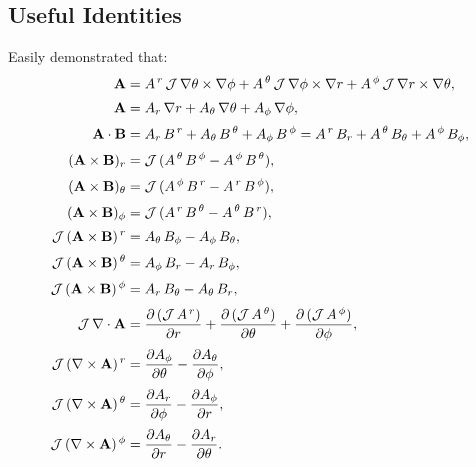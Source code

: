 \documentclass[notitlepage,12pt]{article}
\begin{document}
\subsection{Useful Identities}\label{s2}
Easily demonstrated that:
\begin{align}
{\bf A} &= A^{\,r}\,{\cal J}\,\nabla\theta\times\nabla\phi
+  A^{\,\theta}\,{\cal J}\,\nabla\phi\times\nabla r
+  A^{\,\phi}\,{\cal J}\,\nabla r\times\nabla\theta,\\[0.5ex]
{\bf A} &= A_r\,\nabla r+A_\theta\,\nabla\theta+A_\phi\,\nabla\phi,\\[0.5ex]
{\bf A}\cdot{\bf B} &= A_r\,B^{\,r}+A_\theta \,B^{\,\theta}+A_\phi\,B^{\,\phi}=A^{\,r}\,B_r+A^{\,\theta}\,B_{\theta}+A^{\,\phi}\,B_\phi,\\[0.5ex]
({\bf A}\times {\bf B})_r &= {\cal J}\,(A^{\,\theta}\,B^{\,\phi}-A^{\,\phi}\,B^{\,\theta}),\\[0.5ex]
({\bf A}\times {\bf B})_\theta &= {\cal J}\,(A^{\,\phi}\,B^{\,r}-A^{\,r}\,B^{\,\phi}),\\[0.5ex]
({\bf A}\times {\bf B})_\phi &= {\cal J}\,(A^{\,r}\,B^{\,\theta}-A^{\,\theta}\,B^{\,r}),\\[0.5ex]
{\cal J}\,({\bf A}\times {\bf B})^{\,r} &= A_{\theta}\,B_{\phi}-A_{\phi}\,B_{\theta},\\[0.5ex]
{\cal J}\,({\bf A}\times {\bf B})^{\,\theta} &= A_{\phi}\,B_{r}-A_{r}\,B_{\phi},\\[0.5ex]
{\cal J}\,({\bf A}\times {\bf B})^{\,\phi} &=A_{r}\,B_{\theta}-A_{\theta}\,B_{r},\\[0.5ex]
{\cal J}\,\nabla \cdot{\bf A} &= \frac{\partial\,({\cal J}\,A^{\,r})}{\partial r} + 
\frac{\partial\,({\cal J}\,A^{\,\theta})}{\partial \theta}+ 
\frac{\partial\,({\cal J}\,A^{\,\phi})}{\partial \phi},\\[0.5ex]
{\cal J}\,(\nabla\times {\bf A})^{\,r}&= \frac{\partial A_\phi}{\partial \theta}
-\frac{\partial A_\theta}{\partial \phi},\\[0.5ex]
{\cal J}\,(\nabla\times {\bf A})^{\,\theta}&= \frac{\partial A_r}{\partial \phi}
-\frac{\partial A_\phi}{\partial r},\\[0.5ex]
{\cal J}\,(\nabla\times {\bf A})^{\,\phi}&= \frac{\partial A_\theta}{\partial r}
-\frac{\partial A_r}{\partial \theta}.
\end{align}
\end{document}
